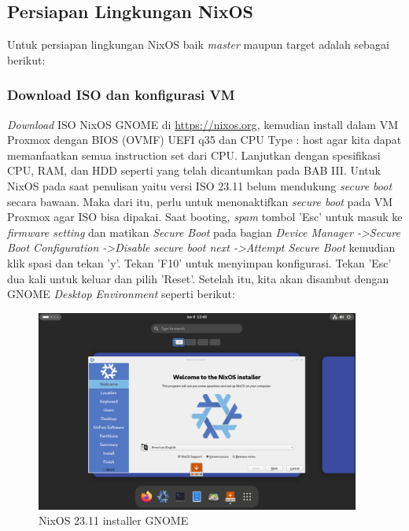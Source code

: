 \documentclass[10pt,twoside]{report}
\begin{document}
\begin{adjustwidth}{20pt}{}
	\subsection{Persiapan Lingkungan NixOS}
	\begin{adjustwidth}{20pt}{}
		Untuk persiapan lingkungan NixOS baik \textit{master} maupun target
		adalah sebagai berikut:
	\end{adjustwidth}
	\subsubsection{Download ISO dan konfigurasi VM}
	\begin{adjustwidth}{20pt}{}
		\textit{Download} ISO NixOS GNOME di \url{https://nixos.org}, kemudian
		install dalam VM Proxmox dengan BIOS (OVMF) UEFI q35 dan CPU Type : host
		agar kita dapat memanfaatkan semua instruction set dari CPU. Lanjutkan
		dengan spesifikasi CPU, RAM, dan HDD seperti yang telah dicantumkan pada
		BAB III. Untuk NixOS pada saat penulisan yaitu versi ISO 23.11 belum
		mendukung \textit{secure boot} secara bawaan. Maka dari itu, perlu untuk
		menonaktifkan \textit{secure boot} pada VM Proxmox agar ISO bisa dipakai.
		Saat booting, \textit{spam} tombol 'Esc' untuk masuk ke \textit{firmware setting} dan
		matikan \textit{Secure Boot} pada bagian \textit{Device Manager
			-\textgreater Secure Boot Configuration -\textgreater Disable secure boot
			next -\textgreater Attempt Secure Boot} kemudian klik spasi dan tekan 'y'.
		Tekan 'F10' untuk menyimpan konfigurasi. Tekan 'Esc' dua kali untuk keluar
		dan pilih 'Reset'. Setelah itu, kita akan disambut dengan GNOME
		\textit{Desktop Environment} seperti berikut:
		\begin{center}
			\begin{figure}[h]
				\includegraphics[width=0.95\textwidth]{images/nixos-23.11-installer.png}
				\caption{NixOS 23.11 installer GNOME}
			\end{figure}
		\end{center}
	\end{adjustwidth}


\end{adjustwidth}
\end{document}
